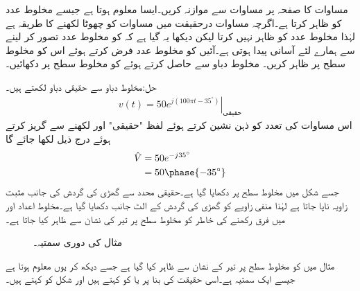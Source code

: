 مساوات  کا صفحہ  پر مساوات  سے موازنہ کریں۔ایسا معلوم ہوتا ہے جیسے   مخلوط عدد کو ظاہر کرتا ہے۔اگرچہ مساوات  درحقیقت میں مساوات  کو چھوٹا لکھنے کا طریقہ ہے لہٰذا  مخلوط عدد کو ظاہر نہیں کرتا لیکن دیکھا یہ گیا ہے کہ  کو مخلوط عدد تصور کر لینے سے ہمارے لئے آسانی پیدا ہوتی ہے۔آئیں  کو مخلوط عدد فرض کرتے ہوئے اس کو مخلوط سطح پر ظاہر کریں۔
مخلوط دباو سے  حاصل کرتے ہوئے  کو مخلوط سطح پر دکھائیں۔

حل:مخلوط دباو سے حقیقی دباو لکھتے ہیں۔
\begin{align*}
v(t)=\left. 50e^{j(100\pi t-35^{\circ})} \right|_{\text{حقیقی}}
\end{align*}
اس مساوات کی تعدد  کو ذہن نشین کرتے ہوئے لفظ "حقیقی" اور  لکھنے سے گریز کرتے ہوئے درج ذیل لکھا جائے گا
\begin{align*}
\hat{V}&=50e^{-j35^{\circ}}\\
&=50\phase{-35^{\circ}}
\end{align*}
جسے شکل  میں مخلوط سطح پر دکھایا گیا ہے۔حقیقی محدد سے گھڑی کی گردش کی جانب مثبت زاویہ ناپا جاتا ہے لہٰذا منفی زاویے کو گھڑی کی گردش کے الٹ جانب دکھایا گیا ہے۔مخلوط اعداد اور  میں فرق رکھنے کی خاطر  کو مخلوط سطح پر تیر کی نشان سے ظاہر کیا جاتا ہے۔
\begin{figure}
\centering
{}
\caption{مثال  کی دوری سمتیہ۔}
\label{شکل_بدلتا_دوری_سمتیہ_مثال_الف}
\end{figure}

مثال  میں  کو مخلوط سطح پر تیر کے نشان سے ظاہر کیا گیا ہے جسے دیکھ کر یوں معلوم ہوتا ہے جیسے  ایک سمتیہ ہے۔اسی حقیقت کی بنا پر  یا  کو  کہتے ہیں اور شکل  کو  کہتے ہیں۔

